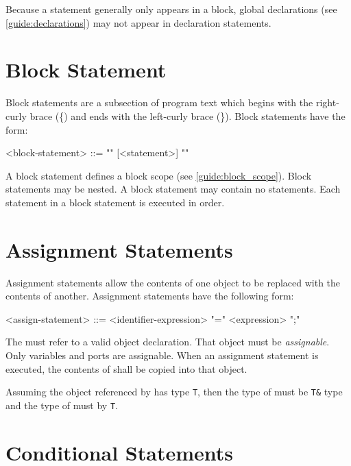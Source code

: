 Because a statement generally only appears in a block, global declarations (see \ref{guide:declarations}) may not appear in declaration statements. 

\section{Block Statement} \label{guide:block_stmt}

Block statements are a subsection of program text which begins with the right-curly brace (\{) and ends with the left-curly brace (\}). Block statements have the form:

\begin{minip}
\begin{grammar}
<block-statement> ::=
"{" [<statement>] "}"
\end{grammar}
\end{minip}

A block statement defines a block scope (see \ref{guide:block_scope}). Block statements may be nested. A block statement may contain no statements. Each statement in a block statement is executed in order.

\section{Assignment Statements} \label{guide:assign_stmt}

Assignment statements allow the contents of one object to be replaced with the contents of another. Assignment statements have the following form:

\begin{minip}
\begin{grammar}
<assign-statement> ::=
<identifier-expression> "=" <expression> ";"
\end{grammar}
\end{minip}

The  must refer to a valid object declaration. That object must be \textit{assignable}. Only variables and ports are assignable. When an assignment statement is executed, the contents of  shall be copied into that object.

Assuming the object referenced by  has type \texttt{T}, then the type of  must be \texttt{T\&} type and the type of  must by \texttt{T}.

\section{Conditional Statements} \label{guide:condition_stmt}

